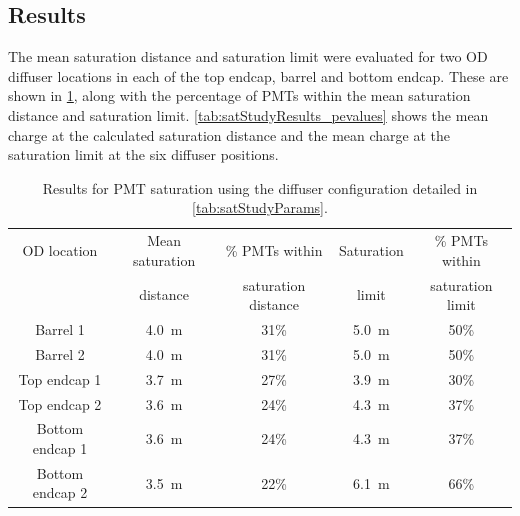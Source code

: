 \documentclass[a4paper,11pt]{article}
\begin{document}
\subsection{Results}\label{subsec:results}

The mean saturation distance and saturation limit were evaluated for two OD diffuser locations in each of the top endcap, barrel and bottom endcap. These are shown in \cref{tab:satStudyResults}, along with the percentage of PMTs within the mean saturation distance and saturation limit. \cref{tab:satStudyResults_pevalues} shows the mean charge at the calculated saturation distance and the mean charge at the saturation limit at the six diffuser positions.
\begin{table}[h!]
    \centering
    \begin{tabular}{|c|c|c|c|c|}
    \hline
        OD location & Mean saturation & \% PMTs within & Saturation  & \% PMTs within \\
                    &  distance & saturation distance & limit &  saturation limit\\
        \hline
        Barrel 1        & 4.0~m & 31\%        & 5.0~m   & 50\% \\
        Barrel 2        & 4.0~m    & 31\%     & 5.0~m   & 50\% \\
		Top endcap 1    & 3.7~m  & 27\%       & 3.9~m & 30\% \\
        Top endcap 2    & 3.6~m  & 24\%       & 4.3~m & 37\% \\ 
		Bottom endcap 1 & 3.6~m  & 24\%       & 4.3~m & 37\% \\
		Bottom endcap 2 & 3.5~m  & 22\%       & 6.1~m & 66\% \\
        \hline
    \end{tabular}
    \caption{Results for PMT saturation using the diffuser configuration detailed in \cref{tab:satStudyParams}.}
    \label{tab:satStudyResults}
\end{table}
%
\end{document}

